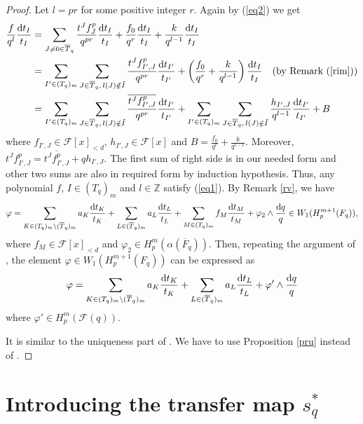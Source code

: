 \documentclass[times,10pt]{amsart}
\newcommand{\Z}{\ensuremath{\mathbb{Z}}}
\newcommand{\dd}{{\rm d}}
\newcommand{\F}{\ensuremath{\mathcal{F}}}
\renewcommand{\phi}{\varphi}
\begin{document}
\begin{proof}
   Let $ l=pr$ for some positive integer $r$. Again by (\ref{eq2}) we get \begin{align*}
     \frac{f}{q^l}\frac{\dd t_I}{t_I}&=  \sum_{J\neq 0\in \overline{T}_q} \frac{t^J f^p_J}{q^{pr}}\frac{\dd t_I}{t_I}+  \frac{f_0}{q^{r}}\frac{\dd t_I}{t_I}+ \frac{k}{q^{l-1}}\frac{\dd t_I}{t_I}\\&= \sum_{I'\in (T_q)_m}\sum_{J\in \overline{T}_q,\, l(J)\notin \tilde{I}} \frac{t^J f^p_{I',J}}{q^{pr}}\frac{\dd t_{I'}}{t_{I'}}+  \left(\frac{f_0}{q^r}+ \frac{k}{q^{l-1}}\right)\frac{\dd t_I}{t_I}\quad ( \text{by Remark } ( \ref{rim}))\\&= \sum_{I'\in (T_q)_m}\sum_{J\in \overline{T}_q,\, l(J)\notin \tilde{I}} \frac{\overline{t^Jf^p_{I',J}}}{q^{pr}}\frac{\dd t_{I'}}{t_{I'}}+ \sum_{I'\in (T_q)_m}\sum_{J\in \overline{T}_q,\, l(J)\notin \tilde{I}} \frac{h_{I',J}}{q^{l-1}}\frac{\dd t_{I'}}{t_{I'}}+ B
 \end{align*} where $f_{I',J}\in \F[x]_{<d}$, $h_{I',J}\in \F[x]$ and $\displaystyle{B= \frac{f_0}{q^r}+\frac{k}{q^{l-1}}}$. Moreover,  $t^J f^p_{I',J}=\overline{t^Jf^p_{I',J}}+qh_{I',J} $. The first sum of right side is in our needed form and other two sums are also in required form by induction hypothesis.  Thus, any polynomial $f$, $I\in (T_q)_m$ and $l\in \Z$ satisfy (\ref{eq1}).  By Remark \ref{rv},  we have  $$  \phi= \sum_{K\in (T_q)_m\setminus (\overline{T}_q)_m} a_K \frac{\dd t_K}{t_K}+ \sum_{L\in (\overline{T}_q)_m} a_L \frac{\dd t_L}{t_L}+ \sum_{M\in (T_q)_m} f_M\frac{\dd t_M}{t_M}+ \phi_2\wedge \frac{\dd q}{q}\in W_1(H_p^{m+1}(F_q)),$$ where  $f_M\in \F[x]_{<d}$ and  $\phi_2\in H_p^m(\alpha(\overline{F}_q))$. 
 Then, repeating the argument of \cite[ Theorem 2.3, Step 2]{Laghribi-Maiti},  the element  $\phi\in W_1(H_p^{m+1}(F_q))$ can be expressed as $$ \phi= \sum_{K\in (T_q)_m\setminus (\overline{T}_q)_m} a_K \frac{\dd t_K}{t_K}+ \sum_{L\in (\overline{T}_q)_m} a_L \frac{\dd t_L}{t_L}+  \phi'\wedge \frac{\dd q}{q}$$ where $\phi'\in H_p^m(\F(q))$.\\

 
 It  is similar to  the uniqueness part of \cite[Theorem 2.3]{Laghribi-Maiti}. We  have to use Proposition \ref{pru} instead of \cite[Proposition 2.2]{Laghribi-Maiti}.
   \end{proof}



   \section{Introducing the transfer map $s_q^*$ }\label{5sit}
   
\end{document}
